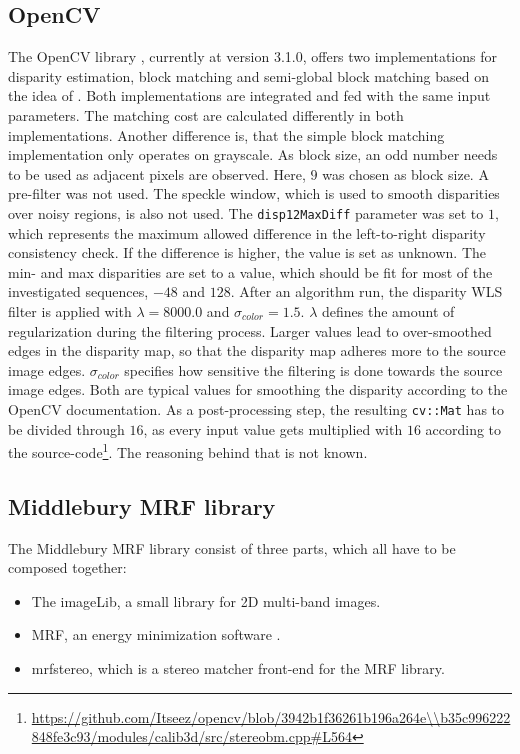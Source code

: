 \subsection*{OpenCV}

The OpenCV library \citep{opencv_library}, currently at version 3.1.0, offers two implementations for disparity estimation, block matching and semi-global block matching based on the idea of \citeauthor{hirschmuller2005accurate}.
Both implementations are integrated and fed with the same input parameters.
The matching cost are calculated differently in both implementations.
Another difference is, that the simple block matching implementation only operates on grayscale.
As block size, an odd number needs to be used as adjacent pixels are observed.
Here, $9$ was chosen as block size.
A pre-filter was not used.
The speckle window, which is used to smooth disparities over noisy regions, is also not used.
The \texttt{disp12MaxDiff} parameter was set to $1$, which represents the maximum allowed difference in the left-to-right disparity consistency check.
If the difference is higher, the value is set as unknown.
The min- and max disparities are set to a value, which should be fit for most of the investigated sequences, $-48$ and $128$.
\newline\newline\noindent After an algorithm run, the disparity WLS filter is applied with $\lambda = 8000.0$ and $\sigma_{color} = 1.5$.
$\lambda$ defines the amount of regularization during the filtering process.
Larger values lead to over-smoothed edges in the disparity map, so that the disparity map adheres more to the source image edges.
$\sigma_{color}$ specifies how sensitive the filtering is done towards the source image edges.
Both are typical values for smoothing the disparity according to the OpenCV documentation.
As a post-processing step, the resulting \texttt{cv::Mat} has to be divided through $16$, as every input value gets multiplied with $16$ according to the source-code\footnote{\url{https://github.com/Itseez/opencv/blob/3942b1f36261b196a264e\\b35c996222848fe3c93/modules/calib3d/src/stereobm.cpp\#L564}}.
The reasoning behind that is not known.

\subsection*{Middlebury MRF library}

The Middlebury MRF library \citep{scharstein2006middlebury} consist of three parts, which all have to be composed together:
\begin{itemize}
  \item The imageLib, a small library for 2D multi-band images.
  \item MRF, an energy minimization software \citep{szeliski2008comparative}.
  \item mrfstereo, which is a stereo matcher front-end for the MRF library.
\end{itemize}


